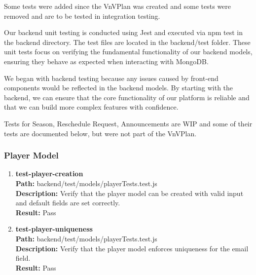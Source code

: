 \documentclass[12pt, titlepage]{article}
\begin{document}
Some tests were added since the VnVPlan was created and some tests were removed and are to be tested in integration testing.

Our backend unit testing is conducted using Jest and executed via npm test in the backend directory. The test files are located in the backend/test folder. These unit tests focus on verifying the fundamental functionality of our backend models, ensuring they behave as expected when interacting with MongoDB.

We began with backend testing because any issues caused by front-end components would be reflected in the backend models. By starting with the backend, we can ensure that the core functionality of our platform is reliable and that we can build more complex features with confidence.

Tests for Season, Reschedule Request, Announcements are WIP and some of their tests are documented below, but were not part of the VnVPlan.

\subsubsection{Player Model}

\begin{enumerate}
    \item{\textbf{test-player-creation}\\}
        \textbf{Path:} backend/test/models/playerTests.test.js\\
        \textbf{Description:} Verify that the player model can be created with valid input and default fields are set correctly.\\
        \textbf{Result:} Pass

    \item{\textbf{test-player-uniqueness}\\}
        \textbf{Path:} backend/test/models/playerTests.test.js\\
        \textbf{Description:} Verify that the player model enforces uniqueness for the email field.\\
        \textbf{Result:} Pass
\end{enumerate}
\end{document}
